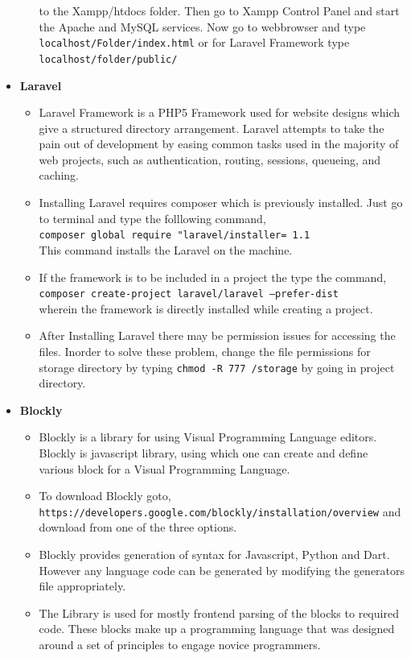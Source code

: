 \documentclass[a4paper,10pt]{report}
\begin{document}
\begin{itemize}
\begin{itemize}
      to the Xampp/htdocs folder. Then go to Xampp Control Panel and start the Apache and MySQL services. Now go to webbrowser
      and type\\\texttt{localhost/Folder/index.html} or for Laravel Framework type\\ \texttt{localhost/folder/public/}\\
      \end{itemize}
      \newpage
      \item \textbf{Laravel}
      \begin{itemize}
	\item
	Laravel Framework is a PHP5 Framework used for website designs which give a structured directory arrangement. 
	Laravel attempts to take the pain out of development by easing common tasks used in the majority of web projects,
	such as authentication, routing, sessions, queueing, and caching.
	\item 
	Installing Laravel requires composer which is previously installed. Just go to terminal and type the folllowing command,\\
	\texttt{composer global require "laravel/installer=~1.1}\\
	This command installs the Laravel on the machine.
	\item
	If the framework is to be included in a project the type the command,\\
	\texttt{composer create-project laravel/laravel --prefer-dist}\\ wherein the framework is directly installed while creating a project.
	\item 
	After Installing Laravel there may be permission issues for accessing the files. Inorder to solve these problem, change the file permissions for
	storage directory by typing \texttt{chmod -R 777 /storage} by going in project directory.\\
      \end{itemize}
      \newpage
      \item \textbf{Blockly}
      \begin{itemize}
	\item
	Blockly is a library for using Visual Programming Language editors. Blockly is javascript library, using which one can
	create and define various block for a Visual Programming Language.
	\item
	To download Blockly goto,\\ \texttt{https://developers.google.com/blockly/installation/overview}
	and download from one of the three options.
	\item 
	Blockly provides generation of syntax for Javascript, Python and Dart. However any language code can be generated by 
	modifying the generators file appropriately.
	\item 
	The Library is used for mostly frontend parsing of the blocks to required code. These blocks make up a programming language that was designed around a set of principles to engage novice programmers.\\
      \end{itemize}
  \end{itemize}
  \newpage
\end{document}
